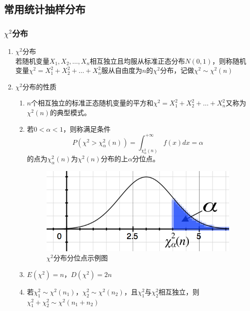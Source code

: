 \subsection{常用统计抽样分布}
\subsubsection{$\chi^2$分布}
\begin{enumerate}
	\item $\chi^2$分布 \\
	若随机变量$X_1, X_2, \dots, X_n$相互独立且均服从标准正态分布$N(0,1)$，则称随机变量$\chi^2 = X_1^2+X_2^2+\dots+X_n^2$服从自由度为$n$的$\chi^2$分布，记做$\chi^2 \sim \chi^2(n)$
	\item $\chi^2$分布的性质 \\
	\begin{enumerate}
		\item $n$个相互独立的标准正态随机变量的平方和$\chi^2 = X_1^2+X_2^2+\dots+X_n^2$又称为$\chi^2(n)$的典型模式。
		\item 若$0<\alpha<1$，则称满足条件
		\begin{equation}
			P(\chi^2 > \chi_{\alpha}^{2}(n)) = \int_{\chi_{\alpha}^{2}(n)}^{+\infty}f(x)dx = \alpha
		\end{equation}
		的点为$\chi_{\alpha}^{2}(n)$为$\chi^2(n)$分布的上$\alpha$分位点。
		\begin{figure}[htbp]
			\centering
			\includegraphics[scale=0.9]{contents/分位点}
			\caption{$\chi^2$分布分位点示例图}
		\end{figure}
		\item $E(\chi^2) = n$，$D(\chi^2)=2n$
		\item 若$\chi_1^2 \sim \chi^2(n_1)$，$\chi_2^2 \sim \chi^2(n_2)$，且$\chi_1^2$与$\chi_2^2$相互独立，则$\chi_1^2 + \chi_2^2 \sim \chi^2(n_1+n_2)$
	\end{enumerate}
\end{enumerate}

